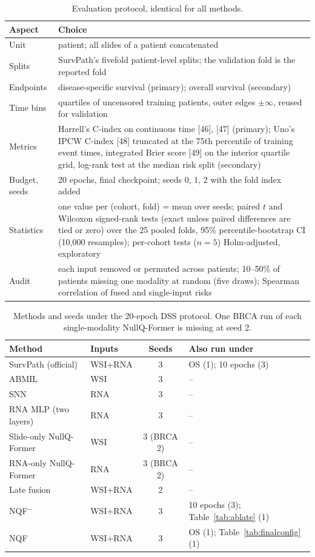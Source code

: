 \documentclass[9pt,journal]{IEEEtran}
\newcommand{\tabsize}{\scriptsize}
\newcommand{\pq}{NullQ-Former}
\newcommand{\pqf}{NQF}
\newcommand{\pqm}{NQF$^{-}$}
\newcommand{\cindex}{C-index}
\begin{document}
\begin{table}[!t]
\caption{Evaluation protocol, identical for all methods.}
\label{tab:protocol}
\centering
\tabsize
\setlength{\tabcolsep}{3pt}
\begin{tabular}{@{}R{0.15\columnwidth}R{0.82\columnwidth}@{}}
\toprule
Aspect & Choice \\
\midrule
Unit & patient; all slides of a patient concatenated \\
Splits & SurvPath's fivefold patient-level splits; the validation fold is the reported fold \\
Endpoints & disease-specific survival (primary); overall survival (secondary) \\
Time bins & quartiles of uncensored training patients, outer edges $\pm\infty$, reused for validation \\
Metrics & Harrell's \cindex{} on continuous time [46], [47] (primary); Uno's IPCW \cindex{} [48] truncated at the 75th percentile of training event times, integrated Brier score [49] on the interior quartile grid, log-rank test at the median risk split (secondary) \\
Budget, seeds & 20 epochs, final checkpoint; seeds 0, 1, 2 with the fold index added \\
Statistics & one value per (cohort, fold) = mean over seeds; paired $t$ and Wilcoxon signed-rank tests (exact unless paired differences are tied or zero) over the 25 pooled folds, 95\% percentile-bootstrap CI (10,000 resamples); per-cohort tests ($n = 5$) Holm-adjusted, exploratory \\
Audit & each input removed or permuted across patients; 10--50\% of patients missing one modality at random (five draws); Spearman correlation of fused and single-input risks \\
\bottomrule
\end{tabular}
\end{table}

\begin{table}[!t]
\caption{Methods and seeds under the 20-epoch DSS protocol. One BRCA run of each single-modality \pq{} is missing at seed 2.}
\label{tab:methods}
\centering
\tabsize
\setlength{\tabcolsep}{3pt}
\begin{tabular}{@{}llcl@{}}
\toprule
Method & Inputs & Seeds & Also run under \\
\midrule
SurvPath (official) & WSI+RNA & 3 & OS (1); 10 epochs (3) \\
ABMIL & WSI & 3 & -- \\
SNN & RNA & 3 & -- \\
RNA MLP (two layers) & RNA & 3 & -- \\
Slide-only \pq{} & WSI & 3 (BRCA 2) & -- \\
RNA-only \pq{} & RNA & 3 (BRCA 2) & -- \\
Late fusion & WSI+RNA & 2 & -- \\
\pqm{} & WSI+RNA & 3 & 10 epochs (3); Table~\ref{tab:ablate} (1) \\
\pqf{} & WSI+RNA & 3 & OS (1); Table~\ref{tab:finalconfig} (1) \\
\bottomrule
\end{tabular}
\end{table}
\end{document}
